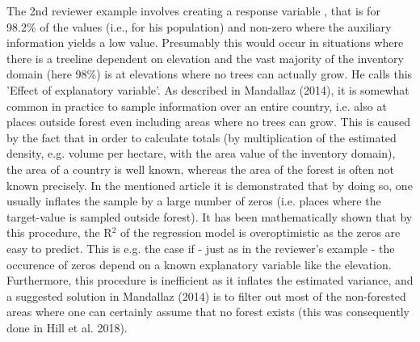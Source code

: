 \documentclass{article}
\begin{document}
The 2nd reviewer example involves creating a response variable , that is  for 98.2\% of the values (i.e., for his population) and non-zero where the auxiliary information yields a low value. Presumably this would occur in situations where there is a treeline dependent on elevation and the vast majority of the inventory domain (here 98\%) is at elevations where no trees can actually grow. He calls this 'Effect of explanatory variable'. As described in Mandallaz (2014), it is somewhat common in practice to sample information over an entire country, i.e. also at places outside forest even including areas where no trees can grow. This is caused by the fact that in order to calculate totals (by multiplication of the estimated density, e.g. volume per hectare, with the area value of the inventory domain), the area of a country is well known, whereas the area of the forest is often not known precisely. In the mentioned article it is demonstrated that by doing so, one usually inflates the sample by a large number of zeros (i.e. places where the target-value is sampled outside forest). It has been mathematically shown that by this procedure, the R$^2$ of the regression model is overoptimistic as the zeros are easy to predict. This is e.g. the case if - just as in the reviewer's example - the occurence of zeros depend on a known explanatory variable like the elevation. Furthermore, this procedure is inefficient as it inflates the estimated variance, and a suggested solution in Mandallaz (2014) is to filter out most of the non-forested areas where one can certainly assume that no forest exists (this was consequently done in Hill et al. 2018).\par 
\end{document}
